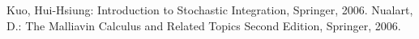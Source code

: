 \documentclass[a4paper,10pt]{jsarticle}
\theoremstyle{definition}
\begin{document}






\begin{thebibliography}{5}
	 Kuo, Hui-Hsiung: Introduction to Stochastic Integration, Springer, 2006.
	 Nualart, D.: The Malliavin Calculus and Related Topics Second Edition, Springer, 2006.
\end{thebibliography}
\end{document}
